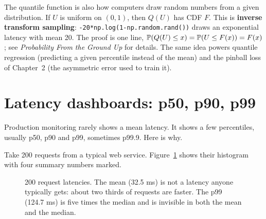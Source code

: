 \begin{connectionbox}
The quantile function is also how computers draw random numbers from a given
distribution. If $U$ is uniform on $(0,1)$, then $Q(U)$ has CDF $F$. This is
\textbf{inverse transform sampling}: \texttt{-20*np.log(1-np.random.rand())} draws an
exponential latency with mean 20. The proof is one line, $\P(Q(U) \le x) =
\P(U \le F(x)) = F(x)$; see \emph{Probability From the Ground Up} for details. The same
idea powers quantile regression (predicting a given percentile instead of the mean) and the pinball loss of Chapter~2 (the asymmetric error used to train it).
\end{connectionbox}

\section{Latency dashboards: p50, p90, p99}

Production monitoring rarely shows a mean latency. It shows a few percentiles, usually
p50, p90 and p99, sometimes p99.9. Here is why.

Take 200 requests from a typical web service. Figure~\ref{fig:quantiles-lat-hist}
shows their histogram with four summary numbers marked.

\begin{figure}[H]
\centering
{}
\caption{200 request latencies. The mean (32.5 ms) is not a latency anyone typically
gets: about two thirds of requests are faster. The p99 (124.7 ms) is five times the
median and is invisible in both the mean and the median.}
\label{fig:quantiles-lat-hist}
\end{figure}

